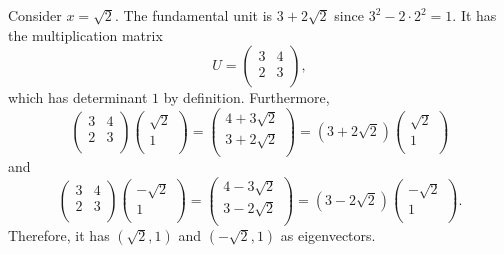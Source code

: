 \begin{example}
  \label{ex:sqrt2-unit}
  Consider $x = \sqrt{2}$.
  The fundamental unit is $3 + 2\sqrt{2}$ since $3^2 - 2 · 2^2 = 1$.
  It has the multiplication matrix
  \[
    U = \begin{pmatrix}
      3 & 4 \\
      2 & 3 \\
    \end{pmatrix},
  \]
  which has determinant $1$ by definition.
  Furthermore,
  \[
    \begin{pmatrix}
      3 & 4 \\
      2 & 3 \\
    \end{pmatrix}
    \begin{pmatrix}
      \sqrt{2} \\ 1 \\
    \end{pmatrix}
    =
    \begin{pmatrix}
      4 + 3\sqrt{2} \\
      3 + 2\sqrt{2} \\
    \end{pmatrix}
    =
    (3 + 2\sqrt{2})
    \begin{pmatrix}
      \sqrt{2} \\ 1 \\
    \end{pmatrix}
  \]
  and
  \[
    \begin{pmatrix}
      3 & 4 \\
      2 & 3 \\
    \end{pmatrix}
    \begin{pmatrix}
      -\sqrt{2} \\ 1 \\
    \end{pmatrix}
    =
    \begin{pmatrix}
      4 - 3\sqrt{2} \\
      3 - 2\sqrt{2} \\
    \end{pmatrix}
    =
    (3 - 2\sqrt{2})
    \begin{pmatrix}
      -\sqrt{2} \\ 1 \\
    \end{pmatrix}.
  \]
  Therefore, it has $(\sqrt{2}, 1)$ and $(-\sqrt{2}, 1)$ as eigenvectors.
\end{example}

